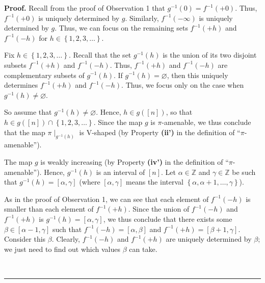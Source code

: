 \documentclass[numbers=enddot,12pt,final,onecolumn,notitlepage]{scrartcl}%
\theoremstyle{definition}
\newenvironment{proof}[1][Proof]{\noindent\textbf{#1.} }{\ \rule{0.5em}{0.5em}}
\newenvironment{vershort}{}{}
\begin{document}
\begin{vershort}
\begin{proof}
Recall from the proof of Observation 1 that $g^{-1}\left(  0\right)
=f^{-1}\left(  +0\right)  $. Thus, $f^{-1}\left(  +0\right)  $ is uniquely
determined by $g$. Similarly, $f^{-1}\left(  -\infty\right)  $ is uniquely
determined by $g$. Thus, we can focus on the remaining sets $f^{-1}\left(
+h\right)  $ and $f^{-1}\left(  -h\right)  $ for $h\in\left\{  1,2,3,\ldots
\right\}  $.

Fix $h\in\left\{  1,2,3,\ldots\right\}  $. Recall that the set $g^{-1}\left(
h\right)  $ is the union of its two disjoint subsets $f^{-1}\left(  +h\right)
$ and $f^{-1}\left(  -h\right)  $. Thus, $f^{-1}\left(  +h\right)  $ and
$f^{-1}\left(  -h\right)  $ are complementary subsets of $g^{-1}\left(
h\right)  $. If $g^{-1}\left(  h\right)  =\varnothing$, then this uniquely
determines $f^{-1}\left(  +h\right)  $ and $f^{-1}\left(  -h\right)  $. Thus,
we focus only on the case when $g^{-1}\left(  h\right)  \neq\varnothing$.

So assume that $g^{-1}\left(  h\right)  \neq\varnothing$. Hence, $h\in
g\left(  \left[  n\right]  \right)  $, so that $h\in g\left(  \left[
n\right]  \right)  \cap\left\{  1,2,3,\ldots\right\}  $. Since the map $g$ is
$\pi$-amenable, we thus conclude that the map $\pi\mid_{g^{-1}\left(
h\right)  }$ is V-shaped (by Property \textbf{(ii')} in the definition of
\textquotedblleft$\pi$-amenable\textquotedblright).

The map $g$ is weakly increasing (by Property \textbf{(iv')} in the
definition of \textquotedblleft$\pi$-amenable\textquotedblright). Hence,
$g^{-1}\left(  h\right)  $ is an interval of $\left[  n\right]  $. Let
$\alpha\in\mathbb{Z}$ and $\gamma\in\mathbb{Z}$ be such that $g^{-1}\left(
h\right)  =\left[  \alpha,\gamma\right]  $ (where $\left[  \alpha
,\gamma\right]  $ means the interval $\left\{  \alpha,\alpha+1,\ldots
,\gamma\right\}  $).

As in the proof of Observation 1, we can see that each element of
$f^{-1}\left(  -h\right)  $ is smaller than each element of $f^{-1}\left(
+h\right)  $. Since the union of $f^{-1}\left(  -h\right)  $ and
$f^{-1}\left(  +h\right)  $ is $g^{-1}\left(  h\right)  =\left[  \alpha
,\gamma\right]  $, we thus conclude that there exists some $\beta\in\left[
\alpha-1,\gamma\right]  $ such that $f^{-1}\left(  -h\right)  =\left[
\alpha,\beta\right]  $ and $f^{-1}\left(  +h\right)  =\left[  \beta
+1,\gamma\right]  $. Consider this $\beta$. Clearly, $f^{-1}\left(  -h\right)
$ and $f^{-1}\left(  +h\right)  $ are uniquely determined by $\beta$; we just
need to find out which values $\beta$ can take.


\end{proof}
\end{vershort}
\end{document}
